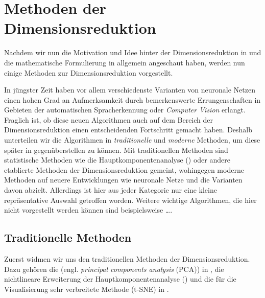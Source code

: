 \chapter{Methoden der Dimensionsreduktion}
\label{ch:MethodenDerDimRed}

Nachdem wir nun die Motivation und Idee hinter der Dimensionsreduktion in  und die mathematische Formulierung
in  allgemein angeschaut haben,
werden nun einige Methoden zur Dimensionsreduktion vorgestellt.

In jüngster Zeit haben vor allem verschiedenste Varianten von neuronale Netzen einen hohen Grad an Aufmerksamkeit durch bemerkenswerte Errungenschaften in Gebieten der automatischen Spracherkennung oder \textit{Computer Vision} erlangt. Fraglich ist, ob diese neuen Algorithmen auch auf dem Bereich der Dimensionsreduktion einen entscheidenden Fortschritt gemacht haben. Deshalb unterteilen wir die Algorithmen in \textit{traditionelle}
und \textit{moderne} Methoden, um diese später in  gegenüberstellen zu können. Mit traditionellen Methoden
sind statistische Methoden wie die Hauptkomponentenanalyse () oder andere etablierte
Methoden der Dimensionsreduktion gemeint, wohingegen moderne Methoden auf neuere Entwicklungen wie neuronale Netze und die Varianten davon abzielt. Allerdings ist hier aus jeder Kategorie nur eine kleine repräsentative Auswahl getroffen worden. Weitere wichtige Algorithmen, die hier nicht vorgestellt werden können sind beispielsweise \dots {}.

\section{Traditionelle Methoden}
\label{ch:MethodenDerDimRed:traditionell}

Zuerst widmen wir uns den traditionellen Methoden der Dimensionsreduktion.
Dazu gehören die  (engl. \textit{principal components analysis} (PCA)) in ,
die nichtlineare Erweiterung der
Hauptkomponentenanalyse ()
und die für die Visualisierung sehr verbreitete Methode  (t-SNE) in .


